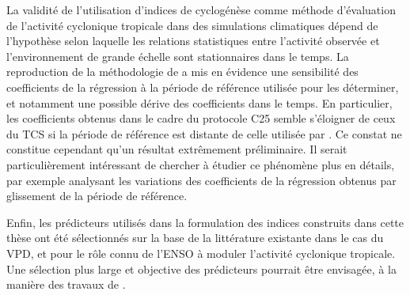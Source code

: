 \documentclass[../main.tex]{subfiles}
\begin{document}
La validité de l'utilisation d'indices de cyclogénèse comme méthode d'évaluation de l'activité cyclonique tropicale dans des simulations climatiques dépend de
l'hypothèse selon laquelle les relations statistiques entre l'activité observée et l'environnement de grande échelle sont stationnaires dans le temps. La
reproduction de la méthodologie de \textcite{tippett_poisson_2011} a mis en évidence une sensibilité des coefficients de la régression à la période de référence
utilisée pour les déterminer, et notamment une possible dérive des coefficients dans le temps. En particulier, les coefficients obtenus dans le cadre du
protocole C25 semble s'éloigner de ceux du TCS si la période de référence est distante de celle utilisée par \textcite{tippett_poisson_2011}. Ce constat ne
constitue cependant qu'un résultat extrêmement préliminaire. Il serait particulièrement intéressant de chercher à étudier ce phénomène plus en détails, par
exemple analysant les variations des coefficients de la régression obtenus par glissement de la période de référence.

Enfin, les prédicteurs utilisés dans la formulation des indices construits dans cette thèse ont été sélectionnés sur la base de la littérature existante dans le
cas du VPD, et pour le rôle connu de l'ENSO à moduler l'activité cyclonique tropicale. Une sélection plus large et objective des prédicteurs pourrait être
envisagée, à la manière des travaux de \textcite{wang_dynamic_2020}.
\end{document}
